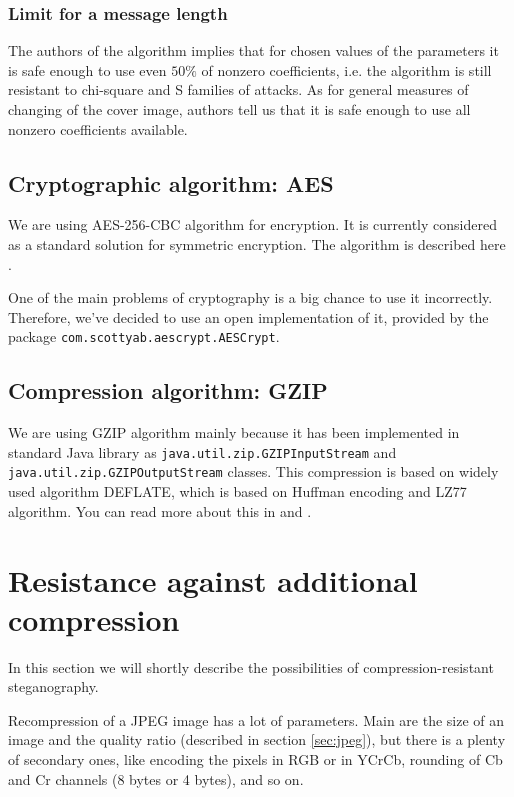 \subsubsection{Limit for a message length}
The authors of the algorithm implies that for chosen values of the parameters
it is safe enough to use even $50\%$ of nonzero coefficients, i.e. the algorithm
is still resistant to chi-square and S families of attacks. As for general measures
of changing of the cover image, authors tell us that it is safe enough to use all
nonzero coefficients available.

\subsection{Cryptographic algorithm: AES}

We are using AES-256-CBC algorithm for encryption. It is currently considered as a standard
solution for symmetric encryption. The algorithm is described here \cite{standard2001announcing}.

One of the main problems of cryptography is a big chance to use it incorrectly.
Therefore, we've decided to use an open implementation of it, provided by the package
\texttt{com.scottyab.aescrypt.AESCrypt}. 


\subsection{Compression algorithm: GZIP}
We are using GZIP algorithm mainly because it has been implemented in standard
Java library as \texttt{java.util.zip.GZIPInputStream} and 
\texttt{java.util.zip.GZIPOutputStream} classes. This compression
is based on widely used algorithm DEFLATE, which is based on Huffman encoding and LZ77 algorithm.
You can read more about this in \cite{deutsch1996deflate} and \cite{deutsch1996gzip}.

\section{Resistance against additional compression}
\label{sec:addcomp}

In this section we will shortly describe the possibilities of compression-resistant
steganography.

Recompression of a JPEG image has a lot of parameters. Main are the size of an image
and the quality ratio (described in section \ref{sec:jpeg}), but there is a plenty of
secondary ones, like encoding the pixels in RGB or in YCrCb, rounding of Cb and Cr channels
(8 bytes or 4 bytes), and so on.

